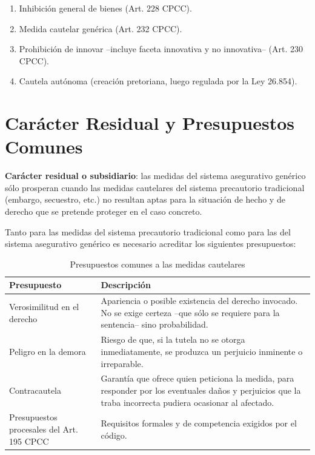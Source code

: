 \documentclass[12pt,oneside]{book}
\begin{document}
\begin{enumerate}
    \item Inhibición general de bienes (Art. 228 CPCC).
    \item Medida cautelar genérica (Art. 232 CPCC).
    \item Prohibición de innovar --incluye faceta innovativa y no innovativa-- (Art. 230 CPCC).
    \item Cautela autónoma (creación pretoriana, luego regulada por la Ley 26.854).
\end{enumerate}

\section{Carácter Residual y Presupuestos Comunes}

\begin{important}
\textbf{Carácter residual o subsidiario}: las medidas del sistema asegurativo genérico sólo prosperan cuando las medidas cautelares del sistema precautorio tradicional (embargo, secuestro, etc.) no resultan aptas para la situación de hecho y de derecho que se pretende proteger en el caso concreto.
\end{important}

Tanto para las medidas del sistema precautorio tradicional como para las del sistema asegurativo genérico es necesario acreditar los siguientes presupuestos:

\begin{table}[H]
\centering
\caption{Presupuestos comunes a las medidas cautelares}
\begin{tabularx}{\textwidth}{>{\raggedright\arraybackslash}p{} >{\raggedright\arraybackslash}X}
\toprule
\textbf{Presupuesto} & \textbf{Descripción} \\
\midrule
Verosimilitud en el derecho & Apariencia o posible existencia del derecho invocado. No se exige certeza --que sólo se requiere para la sentencia-- sino probabilidad. \\
Peligro en la demora & Riesgo de que, si la tutela no se otorga inmediatamente, se produzca un perjuicio inminente o irreparable. \\
Contracautela & Garantía que ofrece quien peticiona la medida, para responder por los eventuales daños y perjuicios que la traba incorrecta pudiera ocasionar al afectado. \\
Presupuestos procesales del Art. 195 CPCC & Requisitos formales y de competencia exigidos por el código. \\
\bottomrule
\end{tabularx}
\end{table}
\end{document}
